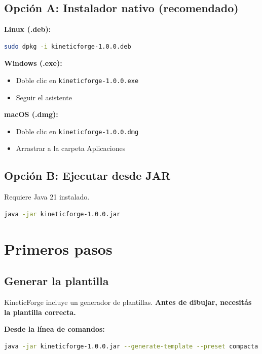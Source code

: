 \documentclass[12pt,a4paper]{article}
\begin{document}
\subsection{Opción A: Instalador nativo (recomendado)}

\textbf{Linux (.deb):}
\begin{lstlisting}[language=bash]
sudo dpkg -i kineticforge-1.0.0.deb
\end{lstlisting}

\textbf{Windows (.exe):}
\begin{itemize}[leftmargin=*]
    \item Doble clic en \texttt{kineticforge-1.0.0.exe}
    \item Seguir el asistente
\end{itemize}

\textbf{macOS (.dmg):}
\begin{itemize}[leftmargin=*]
    \item Doble clic en \texttt{kineticforge-1.0.0.dmg}
    \item Arrastrar a la carpeta Aplicaciones
\end{itemize}

\subsection{Opción B: Ejecutar desde JAR}

Requiere Java 21 instalado.

\begin{lstlisting}[language=bash]
java -jar kineticforge-1.0.0.jar
\end{lstlisting}

\section{Primeros pasos}

\subsection{Generar la plantilla}

KineticForge incluye un generador de plantillas. \textbf{Antes de dibujar, necesitás
la plantilla correcta.}

\textbf{Desde la línea de comandos:}
\begin{lstlisting}[language=bash]
java -jar kineticforge-1.0.0.jar --generate-template --preset compacta
\end{lstlisting}
\end{document}
